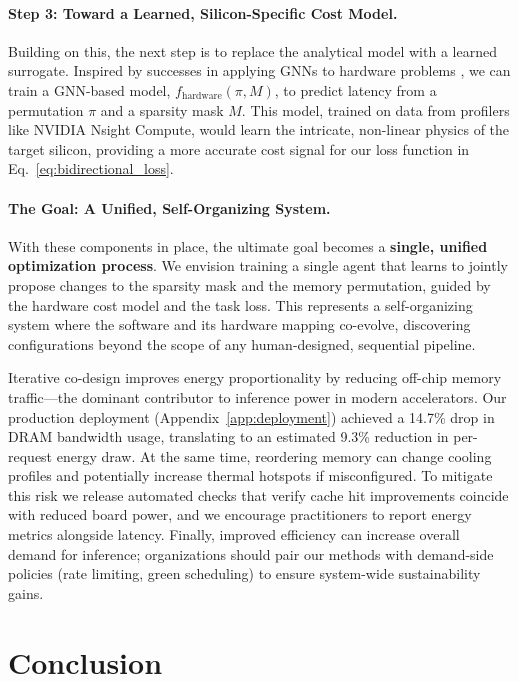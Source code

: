 \documentclass{article}
\begin{document}
\paragraph{Step 3: Toward a Learned, Silicon-Specific Cost Model.}
Building on this, the next step is to replace the analytical model with a learned surrogate. Inspired by successes in applying GNNs to hardware problems \citep{mirhoseini2021graph}, we can train a GNN-based model, $f_{\text{hardware}}(\pi, M)$, to predict latency from a permutation $\pi$ and a sparsity mask $M$. This model, trained on data from profilers like NVIDIA Nsight Compute, would learn the intricate, non-linear physics of the target silicon, providing a more accurate cost signal for our loss function in Eq.~\ref{eq:bidirectional_loss}.

\paragraph{The Goal: A Unified, Self-Organizing System.}
With these components in place, the ultimate goal becomes a \textbf{single, unified optimization process}. We envision training a single agent that learns to jointly propose changes to the sparsity mask and the memory permutation, guided by the hardware cost model and the task loss. This represents a self-organizing system where the software and its hardware mapping co-evolve, discovering configurations beyond the scope of any human-designed, sequential pipeline.

\sectionbroaderimpact
Iterative co-design improves energy proportionality by reducing off-chip memory traffic---the dominant contributor to inference power in modern accelerators. Our production deployment (Appendix~\ref{app:deployment}) achieved a 14.7\% drop in DRAM bandwidth usage, translating to an estimated 9.3\% reduction in per-request energy draw. At the same time, reordering memory can change cooling profiles and potentially increase thermal hotspots if misconfigured. To mitigate this risk we release automated checks that verify cache hit improvements coincide with reduced board power, and we encourage practitioners to report energy metrics alongside latency. Finally, improved efficiency can increase overall demand for inference; organizations should pair our methods with demand-side policies (rate limiting, green scheduling) to ensure system-wide sustainability gains.

\section{Conclusion}
\label{sec:conclusion}
\end{document}
